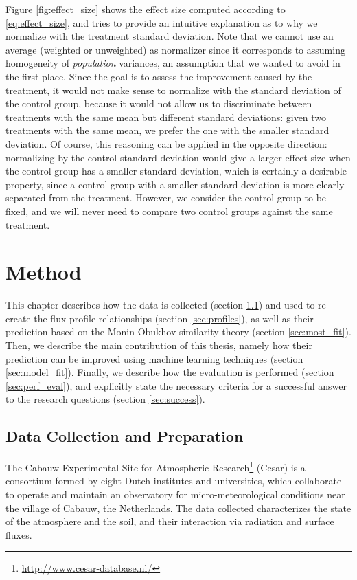\documentclass[a4paper,11pt]{kth-mag}
\begin{document}
Figure \ref{fig:effect_size} shows the effect size computed according to \ref{eq:effect_size}, and tries to provide an intuitive explanation as to why we normalize with the treatment standard deviation. Note that we cannot use an average (weighted or unweighted) as normalizer since it corresponds to assuming homogeneity of \emph{population} variances, an assumption that we wanted to avoid in the first place. Since the goal is to assess the improvement caused by the treatment, it would not make sense to normalize with the standard deviation of the control group, because it would not allow us to discriminate between treatments with the same mean but different standard deviations: given two treatments with the same mean, we prefer the one with the smaller standard deviation. Of course, this reasoning can be applied in the opposite direction: normalizing by the control standard deviation would give a larger effect size when the control group has a smaller standard deviation, which is certainly a desirable property, since a control group with a smaller standard deviation is more clearly separated from the treatment. However, we consider the control group to be fixed, and we will never need to compare two control groups against the same treatment.



\chapter{Method}
\label{ch:method}
This chapter describes how the data is collected (section \ref{sec:data_collection}) and used to re-create the flux-profile relationships (section \ref{sec:profiles}), as well as their prediction based on the Monin-Obukhov similarity theory (section \ref{sec:most_fit}). Then, we describe the main contribution of this thesis, namely how their prediction can be improved using machine learning techniques (section \ref{sec:model_fit}). Finally, we describe how the evaluation is performed (section \ref{sec:perf_eval}), and explicitly state the necessary criteria for a successful answer to the research questions (section  \ref{sec:success}).

\section{Data Collection and Preparation}
\label{sec:data_collection}
The Cabauw Experimental Site for Atmospheric Research\footnote{\url{http://www.cesar-database.nl/}} (Cesar) is a consortium formed by eight Dutch institutes and universities, which collaborate to operate and maintain an observatory for micro-meteorological conditions near the village of Cabauw, the Netherlands. The data collected characterizes the state of the atmosphere and the soil, and their interaction via radiation and surface fluxes.
\end{document}
